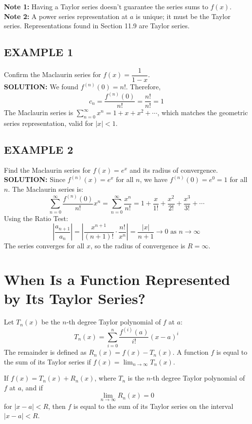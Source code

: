 \documentclass{article}
\theoremstyle{mystyle}
\begin{document}
\textbf{Note 1:} Having a Taylor series doesn't guarantee the series sums to \(f(x)\).
\textbf{Note 2:} A power series representation at \(a\) is unique; it must be the Taylor series. Representations found in Section 11.9 are Taylor series.

\subsection*{EXAMPLE 1}
Confirm the Maclaurin series for \(f(x) = \dfrac{1}{1-x}\).\\
\textbf{SOLUTION:}
We found \(f^{(n)}(0) = n!\). Therefore,
\[ c_n = \dfrac{f^{(n)}(0)}{n!} = \dfrac{n!}{n!} = 1 \]
The Maclaurin series is \( \sum_{n=0}^{\infty} x^n = 1 + x + x^2 + \cdots \), which matches the geometric series representation, valid for \(|x|<1\).

\subsection*{EXAMPLE 2}
Find the Maclaurin series for \(f(x) = e^x\) and its radius of convergence.\\
\textbf{SOLUTION:}
Since \(f^{(n)}(x) = e^x\) for all \(n\), we have \(f^{(n)}(0) = e^0 = 1\) for all \(n\). The Maclaurin series is:
\[ \sum_{n=0}^{\infty} \dfrac{f^{(n)}(0)}{n!} x^n = \sum_{n=0}^{\infty} \dfrac{x^n}{n!} = 1 + \dfrac{x}{1!} + \dfrac{x^2}{2!} + \dfrac{x^3}{3!} + \cdots \]
Using the Ratio Test:
\[ \left| \dfrac{a_{n+1}}{a_n} \right| = \left| \dfrac{x^{n+1}}{(n+1)!} \cdot \dfrac{n!}{x^n} \right| = \dfrac{|x|}{n+1} \to 0 \text{ as } n \to \infty \]
The series converges for all \(x\), so the radius of convergence is \(R = \infty\).

\section*{When Is a Function Represented by Its Taylor Series?}
Let \(T_n(x)\) be the \(n\)-th degree Taylor polynomial of \(f\) at \(a\):
\[ T_n(x) = \sum_{i=0}^{n} \dfrac{f^{(i)}(a)}{i!} (x-a)^i \]
The remainder is defined as \(R_n(x) = f(x) - T_n(x)\). A function \(f\) is equal to the sum of its Taylor series if \(f(x) = \lim_{n\to\infty} T_n(x)\).

\begin{tcolorbox}[
    colback=white,
    colframe=orange!80!white,
    title=Theorem 5,
    boxrule=0.5mm,
    arc=3mm
    ]
    If \(f(x) = T_n(x) + R_n(x)\), where \(T_n\) is the \(n\)-th degree Taylor polynomial of \(f\) at \(a\), and if
    \[ \lim_{n\to\infty} R_n(x) = 0 \]
    for \(|x-a| < R\), then \(f\) is equal to the sum of its Taylor series on the interval \(|x-a| < R\).
\end{tcolorbox}
\end{document}
